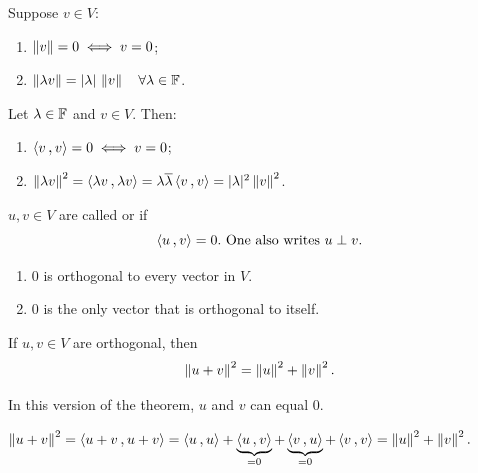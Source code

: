 \begin{thm} 
  \label{thm: properties of the norm}
  Suppose $v \in V$:
  \begin{enumerate}[label=\textbf{(\alph*)}]
    \item $\left \lVert v \right \rVert = 0 \iff v = 0$;
    \item $\left \lVert \lambda v \right \rVert = |\lambda| \,\left \lVert v \right \rVert \quad \forall \lambda \in \mathbb{F}$.
  \end{enumerate}
\end{thm}
\begin{prf}
  Let $\lambda \in \mathbb{F}$ and $v \in V$. Then:
  \begin{enumerate}[label=\textbf{(\alph*)}]
    \item $\ip{v}{v} = 0 \iff v=0$;
    \item $\norm{\lambda v}^2 = \ip{\lambda v}{\lambda v} = \lambda \overline{\lambda} \ip{v}{v} = |\lambda|^2 \norm{v}^2$.
  \end{enumerate}
  \vspace{-1em}
\end{prf}

\setcounter{thm}{9}
\begin{mydef}[orthogonal]
  $u,v \in V$ are called  or  if
  \begin{equation}
    \ip{u}{v} = 0. \text{ One also writes } u \perp v.
  \end{equation}
\end{mydef}

\begin{thm} 
  \phantom{.}
  \begin{enumerate}[label=\textbf{(\alph*)}]
    \item $0$ is orthogonal to every vector in $V$.
    \item $0$ is the only vector that is orthogonal to itself.
  \end{enumerate}
\end{thm}

\begin{thm}
  \label{thm: pythagorean theorem}
  If $u,v \in V$ are orthogonal, then
  \begin{equation}
    \left \lVert u+v \right \rVert^2 = \left \lVert u \right \rVert^2 + \left \lVert v \right \rVert^2.
  \end{equation}

  In this version of the theorem, $u$ and $v$ can equal $0$.
\end{thm}
\begin{prf}
  $\norm{u+v}^2 = \ip{u+v}{u+v} = \ip{u}{u} + \underbrace{\ip{u}{v}}_{=0} + \underbrace{\ip{v}{u}}_{=0} + \ip{v}{v} = \norm{u}^2 + \norm{v}^2.$
\end{prf}

